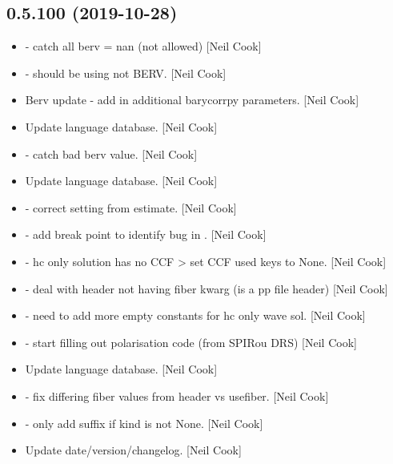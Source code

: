 \documentclass[a4paper,10pt,english]{report}
\begin{document}
\subsection{0.5.100 (2019-10-28)}
\label{\detokenize{misc/changelog:id42}}\begin{itemize}
\item {} 
 - catch all berv = nan (not allowed) {[}Neil
Cook{]}

\item {} 
 - should be using  not BERV. {[}Neil
Cook{]}

\item {} 
Berv update - add in additional barycorrpy parameters. {[}Neil Cook{]}

\item {} 
Update language database. {[}Neil Cook{]}

\item {} 
 - catch bad berv value. {[}Neil Cook{]}

\item {} 
Update language database. {[}Neil Cook{]}

\item {} 
 - correct setting  from estimate.
{[}Neil Cook{]}

\item {} 
 - add break point to identify bug in
. {[}Neil Cook{]}

\item {} 
 - hc only solution has no CCF \textendash{}\textgreater{} set CCF used
keys to None. {[}Neil Cook{]}

\item {} 
 - deal with header not having fiber kwarg (is a
pp file header) {[}Neil Cook{]}

\item {} 
 - need to add more empty constants for hc only
wave sol. {[}Neil Cook{]}

\item {} 
 - start filling out polarisation code (from SPIRou
DRS) {[}Neil Cook{]}

\item {} 
Update language database. {[}Neil Cook{]}

\item {} 
 - fix differing fiber values from header vs
usefiber. {[}Neil Cook{]}

\item {} 
 - only add suffix if kind is not None. {[}Neil Cook{]}

\item {} 
Update date/version/changelog. {[}Neil Cook{]}

\end{itemize}
\end{document}
